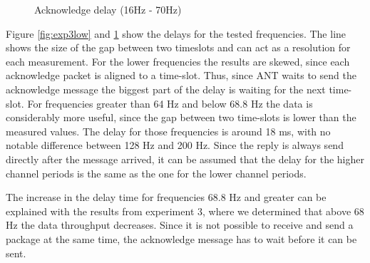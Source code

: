 \begin{description}
\begin{figure}[H]
		\caption{Acknowledge delay (16Hz - 70Hz)}\label{fig:exp3high}
	\end{figure}
	Figure \ref{fig:exp3low} and \ref{fig:exp3high} show the delays for the tested frequencies. The line shows the size of the gap between two timeslots and can act as a resolution for each measurement. For the lower frequencies the results are skewed, since each acknowledge packet is aligned to a time-slot. Thus, since ANT waits to send the acknowledge message the biggest part of the delay is waiting for the next time-slot. For frequencies greater than 64 Hz and below 68.8 Hz the data is considerably more useful, since the gap between two time-slots is lower than the measured values. The delay for those frequencies is around 18 ms, with no notable difference between 128 Hz and 200 Hz. Since the reply is always send directly after the message arrived, it can be assumed that the delay for the higher channel periods is the same as the one for the lower channel periods.
	
	The increase in the delay time for frequencies 68.8 Hz and greater can be explained with the results from experiment 3, where we determined that above 68 Hz the data throughput decreases. Since it is not possible to receive and send a package at the same time, the acknowledge message has to wait before it can be sent.
\end{description}
\newpage

